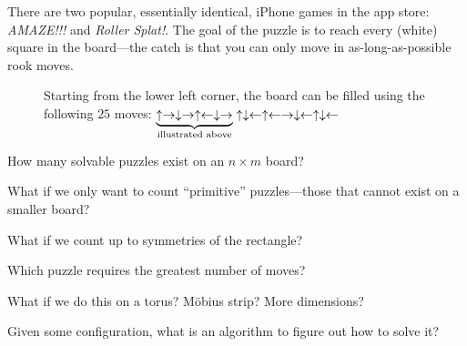 \documentclass{article}
\begin{document}
There are two popular, essentially identical, iPhone games in the app store:
\textit{AMAZE!!!} and \textit{Roller Splat!}.
The goal of the puzzle is to reach every (white) square in the board---the catch
is that you can only move in as-long-as-possible rook moves.
\begin{figure}[ht!]
  \centering
  \caption{
    Starting from the lower left corner, the board can be filled using the following $25$ moves: $
      \protect\underbrace{
        \uparrow\rightarrow\downarrow\rightarrow\uparrow\leftarrow\downarrow\rightarrow
      }_\text{illustrated above}
      \uparrow\downarrow\leftarrow\uparrow\leftarrow\rightarrow\downarrow\leftarrow\uparrow\downarrow\leftarrow
    $
  }
\end{figure}

\begin{question}
  How many solvable puzzles exist on an $n \times m$ board?
\end{question}

\begin{related}
  \item What if we only want to count ``primitive'' puzzles---those that cannot
  exist on a smaller board?
  \item What if we count up to symmetries of the rectangle?
  \item Which puzzle requires the greatest number of moves?
  \item What if we do this on a torus? M\"obius strip? More dimensions?
  \item Given some configuration, what is an algorithm to figure out how to solve it?
\end{related}
\end{document}

